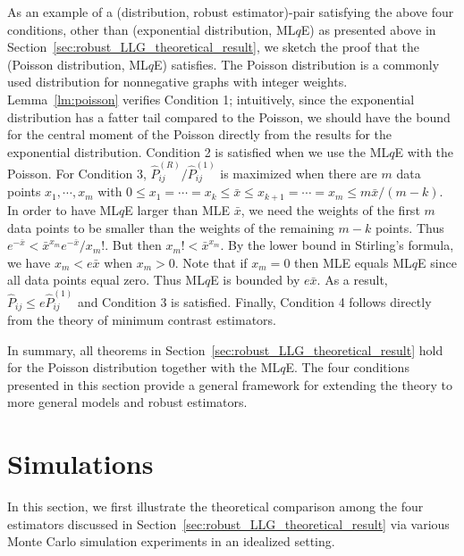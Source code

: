 As an example of a (distribution, robust estimator)-pair satisfying the above four conditions, other than (exponential distribution, ML$q$E) as presented above in Section~\ref{sec:robust_LLG_theoretical_result}, we sketch the proof that the (Poisson distribution, ML$q$E) satisfies. The Poisson distribution is a commonly used distribution for nonnegative graphs with integer weights. Lemma~\ref{lm:poisson} verifies Condition 1; intuitively, since the exponential distribution has a fatter tail compared to the Poisson, we should have the bound for the central moment of the Poisson directly from the results for the exponential distribution. Condition 2 is satisfied when we use the ML$q$E with the Poisson. For Condition 3, $\hat{P}^{(R)}_{ij}/\hat{P}^{(1)}_{ij}$ is maximized when there are $m$ data points $x_1, \cdots, x_m$ with $0 \le x_1 = \cdots = x_k \le \bar{x} \le x_{k+1} = \cdots = x_m \le m \bar{x}/(m - k)$. In order to have ML$q$E larger than MLE $\bar{x}$, we need the weights of the first $m$ data points to be smaller than the weights of the remaining $m - k$ points. Thus $e^{-\bar{x}} < \bar{x}^{x_m} e^{-\bar{x}} / x_m!$. But then $x_m! < \bar{x}^{x_m}$. By the lower bound in Stirling's formula, we have $x_m < e \bar{x}$ when $x_m > 0$. Note that if $x_m = 0$ then MLE equals ML$q$E since all data points equal zero. Thus ML$q$E is bounded by $e \bar{x}$. As a result, $\hat{P}_{ij} \le e \hat{P}_{ij}^{(1)}$ and Condition 3 is satisfied. Finally, Condition 4 follows directly from the theory of minimum contrast estimators.


In summary, all theorems in Section~\ref{sec:robust_LLG_theoretical_result} hold for the Poisson distribution together with the ML$q$E. The four conditions presented in this section provide a general framework for extending the theory to more general models and robust estimators.







\section{Simulations}
\label{sec:robust_LLG_simulation}

In this section, we first illustrate the theoretical comparison among the four estimators discussed in Section~\ref{sec:robust_LLG_theoretical_result} via various Monte Carlo simulation experiments in an idealized setting.

